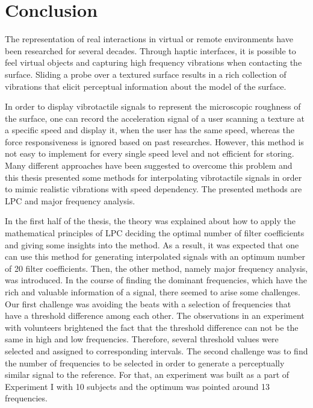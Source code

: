 \chapter{Conclusion}
\thispagestyle{empty}%
The representation of real interactions in virtual or remote environments have been researched for several decades. Through haptic interfaces, it is possible to feel virtual objects and capturing high frequency vibrations when contacting the surface. Sliding a probe over a textured surface results in a rich collection of vibrations that elicit perceptual information about the model of the surface.

In order to display vibrotactile signals to represent the microscopic roughness of the surface, one can record the acceleration signal of a user scanning a texture at a specific speed and display it, when the user has the same speed, whereas the force responsiveness is ignored based on past researches. However, this method is not easy to implement for every single speed level and not efficient for storing. Many different approaches have been suggested to overcome this problem and this thesis presented some methods for interpolating vibrotactile signals in order to mimic realistic vibrations with speed dependency. The presented methods are LPC and major frequency analysis.

In the first half of the thesis, the theory was explained about how to apply the mathematical principles of LPC deciding the optimal number of filter coefficients and giving some insights into the method. As a result, it was expected that one can use this method for generating interpolated signals with an optimum number of 20 filter coefficients. Then, the other method, namely major frequency analysis, was introduced. In the course of finding the dominant frequencies, which have the rich and valuable information of a signal, there seemed to arise some challenges. Our first challenge was avoiding the beats with a selection of frequencies that have a threshold difference among each other. The observations in an experiment with volunteers brightened the fact that the threshold difference can not be the same in high and low frequencies. Therefore, several threshold values were selected and assigned to corresponding intervals. The second challenge was to find the number of frequencies to be selected in order to generate a perceptually similar signal to the reference. For that, an experiment was built as a part of Experiment I with 10 subjects and the optimum was pointed around 13 frequencies.

